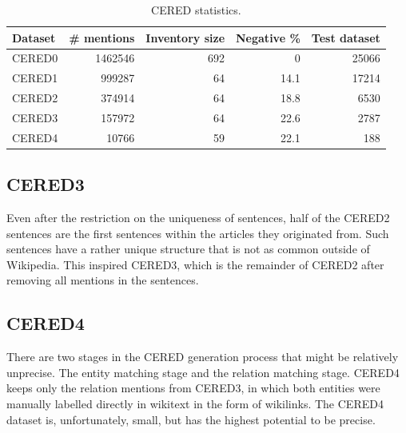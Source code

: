 \begin{table}

\caption{CERED statistics.}

\label{table:CEREDsStatistics}

\begin{tabular}{p{} r r r r }

\hline
Dataset & \# mentions & Inventory size & Negative \% & Test dataset\\
\hline
\hline
CERED0 & \num{1462546} & 692 & 0 & \num{25066}\\
CERED1 & \num{999287} & 64 & 14.1 & \num{17214}\\
CERED2 & \num{374914} & 64 & 18.8 & \num{6530}\\
CERED3 & \num{157972} & 64 & 22.6 & \num{2787}\\
CERED4 & \num{10766} & 59 & 22.1 & 188\\
\hline


\end{tabular}

\end{table}






\subsection{CERED3}
Even after the restriction on the uniqueness of sentences, half of the CERED2 sentences are the first sentences within the articles they originated from. Such sentences have a rather unique structure that is not as common outside of Wikipedia. This inspired CERED3, which is the remainder of CERED2 after removing all mentions in the  sentences.

\subsection{CERED4}
There are two stages in the CERED generation process that might be relatively unprecise. The entity matching stage and the relation matching stage. CERED4 keeps only the relation mentions from CERED3, in which both entities were manually labelled directly in wikitext in the form of wikilinks. The CERED4 dataset is, unfortunately, small, but has the highest potential to be precise.


